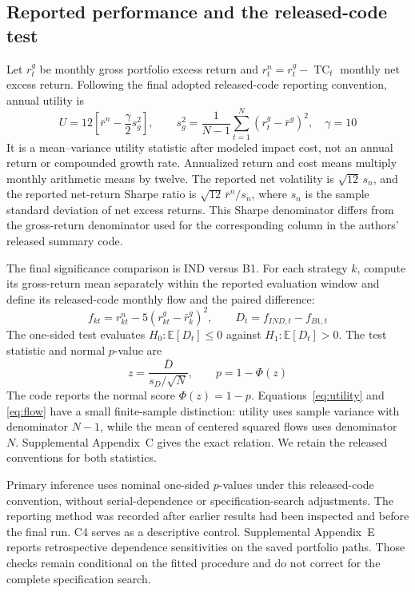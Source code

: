 \documentclass[12pt,letterpaper,fleqn]{article}
\newcommand{\E}{\mathbb{E}}
\begin{document}
\subsection{Reported performance and the released-code test}\label{sec:inference}
Let $r^g_t$ be monthly gross portfolio excess return and $r^n_t=r^g_t-\operatorname{TC}_t$ monthly net excess return. Following the final adopted released-code reporting convention, annual utility is
\begin{equation}\label{eq:utility}
 U=12\left[\bar r^n-\frac{\gamma}{2}s_g^2\right],\qquad
 s_g^2=\frac{1}{N-1}\sum_{t=1}^{N}(r^g_t-\bar r^g)^2,\quad\gamma=10
\end{equation}
It is a mean--variance utility statistic after modeled impact cost, not an annual return or compounded growth rate. Annualized return and cost means multiply monthly arithmetic means by twelve. The reported net volatility is $\sqrt{12}\,s_n$, and the reported net-return Sharpe ratio is $\sqrt{12}\,\bar r^n/s_n$, where $s_n$ is the sample standard deviation of net excess returns. This Sharpe denominator differs from the gross-return denominator used for the corresponding column in the authors' released summary code.

The final significance comparison is IND versus B1. For each strategy $k$, compute its gross-return mean separately within the reported evaluation window and define its released-code monthly flow and the paired difference:
\begin{equation}\label{eq:flow}
 f_{kt}=r^n_{kt}-5(r^g_{kt}-\bar r^g_k)^2,\qquad
 D_t=f_{IND,t}-f_{B1,t}
\end{equation}
The one-sided test evaluates $H_0:\E[D_t]\leq0$ against $H_1:\E[D_t]>0$. The test statistic and normal $p$-value are
\begin{equation}\label{eq:test}
 z=\frac{\bar D}{s_D/\sqrt N},\qquad p=1-\Phi(z)
\end{equation}
The code reports the normal score $\Phi(z)=1-p$. Equations~\eqref{eq:utility} and \eqref{eq:flow} have a small finite-sample distinction: utility uses sample variance with denominator $N-1$, while the mean of centered squared flows uses denominator $N$. Supplemental Appendix~C gives the exact relation. We retain the released conventions for both statistics.

Primary inference uses nominal one-sided $p$-values under this released-code convention, without serial-dependence or specification-search adjustments. The reporting method was recorded after earlier results had been inspected and before the final run. C4 serves as a descriptive control. Supplemental Appendix~E reports retrospective dependence sensitivities on the saved portfolio paths. Those checks remain conditional on the fitted procedure and do not correct for the complete specification search.
\end{document}
